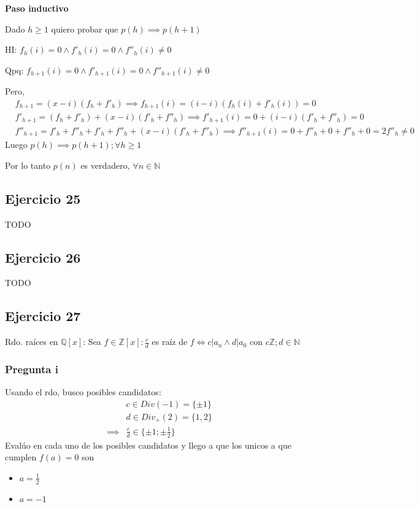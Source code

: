 \textbf{Paso inductivo}

Dado $ h \geq 1 $ quiero probar que $ p(h) \implies p(h+1) $

HI: $ f_h(i) = 0 \wedge f'_h(i) = 0 \wedge f''_h(i) \neq 0 $

Qpq: $ f_{h+1}(i) = 0 \wedge f'_{h+1}(i) = 0 \wedge f''_{h+1}(i) \neq 0 $

Pero,
\begin{align*}
    &f_{h+1} = (x-i)(f_h + f'_h) \implies f_{h+1}(i) = (i-i)(f_h(i) + f'_h(i)) = 0 \\
    &f'_{h+1} = (f_h + f'_h) + (x-i)(f'_h + f''_h) \implies f'_{h+1}(i) = 0 + (i-i)(f'_h + f''_h) = 0 \\
    &f''_{h+1} = f'_h + f''_h + f'_h + f''_h + (x-i)(f'_h + f''_h) \implies f''_{h+1}(i) = 0 + f''_h + 0 + f''_h + 0 = 2f''_h \neq 0
\end{align*}
Luego $ p(h) \implies p(h+1); \forall h \geq 1 $

Por lo tanto $ p(n) $ es verdadero, $ \forall n \in \mathbb{N} $

\subsection{Ejercicio 25}
TODO

\subsection{Ejercicio 26}
TODO

\subsection{Ejercicio 27}
Rdo. raíces en $ \mathbb{Q}[x] $: Sea $ f \in \mathbb{Z}[x]: \frac{c}{d} $ es raíz de $ f \iff c | a_n \wedge d|a_0 $ con $ c \mathbb{Z}; d \in \mathbb{N}   $

\subsubsection{Pregunta i}
Usando el rdo, busco posibles candidatos:
\begin{align*}
    &c \in Div(-1) = \{ \pm 1 \} \\
    &d \in Div_+(2) = \{ 1,2 \} \\
    \implies &\frac{c}{d} \in \{ \pm 1; \pm \frac{1}{2} \}
\end{align*}
Evalúo en cada uno de los posibles candidatos y llego a que los unicos a que cumplen $ f(a) = 0 $ son
\begin{itemize}
    \item $ a = \frac{1}{2} $
    \item $ a = -1 $
\end{itemize}
